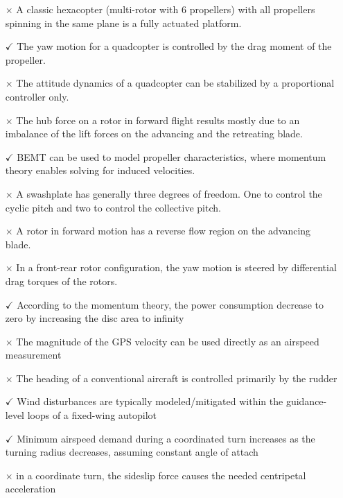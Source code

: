 \documentclass[landscape,a0paper,fontscale=0.285]{baposter} %
\newcommand{\compresslist}{ %
\setlength{\itemsep}{1pt}
\setlength{\parskip}{0pt}
\setlength{\parsep}{0pt}
}
\begin{document}
\begin{poster}
{\colorbox[HTML]{CCFFFF}{}

\begin{itemize}\compresslist
     \item[$\times$] A classic hexacopter (multi-rotor with 6 propellers) with all propellers spinning in the same plane is a fully actuated platform.
    \item[$\checkmark$] The yaw motion for a quadcopter is controlled by the drag moment of the propeller.
    \item[$\times$] The attitude dynamics of a quadcopter can be stabilized by a proportional controller only.
    \item[$\times$] The hub force on a rotor in forward flight results mostly due to an imbalance of the lift forces on the advancing and the retreating blade.
    \item[$\checkmark$] BEMT can be used to model propeller characteristics, where momentum theory enables solving for induced velocities.
    \item[$\times$] A swashplate has generally three degrees of freedom. One to control the cyclic pitch and two to control the collective pitch.
    \item[$\times$] A rotor in forward motion has a reverse flow region on the advancing blade.
    \item[$\times$] In a front-rear rotor configuration, the yaw motion is steered by differential drag torques of the rotors.
    \item[$\checkmark$]  According to the momentum theory, the power consumption decrease to zero  by increasing  the disc area to infinity
\end{itemize}



\colorbox[HTML]{CCFFFF}{}

\begin{itemize}\compresslist
    \item[$\times$] The magnitude of the GPS velocity can be used directly as an airspeed measurement
    \item[$\times$] The heading of a conventional aircraft is controlled primarily by the rudder 
    \item[$\checkmark$] Wind disturbances are typically modeled/mitigated within the guidance-
  level loops of a fixed-wing autopilot 
    \item[$\checkmark$] Minimum airspeed demand during a coordinated turn increases as the
  turning radius decreases, assuming constant angle of attach 
    \item[$\times$] in a coordinate turn, the sideslip force causes the needed centripetal acceleration
\end{itemize}
}

\end{poster}
\end{document}
